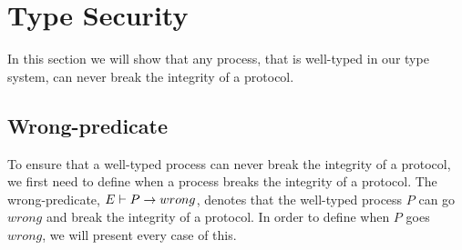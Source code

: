 \section{Type Security}
In this section we will show that any process, that is well-typed in our type system, can never break the integrity of a protocol.
\subsection{Wrong-predicate}
To ensure that a well-typed process can never break the integrity of a protocol, we first need to define when a process breaks the integrity of a protocol.
The wrong-predicate, $E \vdash P \rightarrow wrong$, denotes that the well-typed process $P$ can go $wrong$ and break the integrity of a protocol. In order to define when $P$ goes $wrong$, we will present every case of this.
